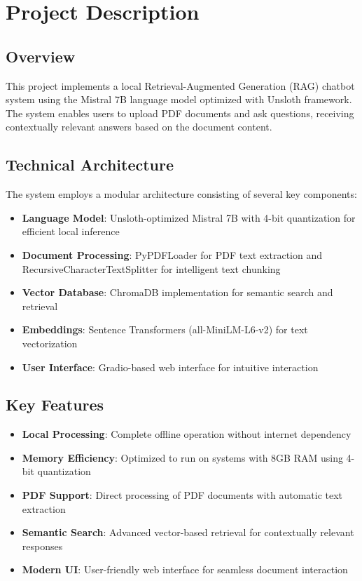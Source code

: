 \section{Project Description}

\subsection{Overview}
This project implements a local Retrieval-Augmented Generation (RAG) chatbot system using the Mistral 7B language model optimized with Unsloth framework. The system enables users to upload PDF documents and ask questions, receiving contextually relevant answers based on the document content.

\subsection{Technical Architecture}
The system employs a modular architecture consisting of several key components:

\begin{itemize}
    \item \textbf{Language Model}: Unsloth-optimized Mistral 7B with 4-bit quantization for efficient local inference
    \item \textbf{Document Processing}: PyPDFLoader for PDF text extraction and RecursiveCharacterTextSplitter for intelligent text chunking
    \item \textbf{Vector Database}: ChromaDB implementation for semantic search and retrieval
    \item \textbf{Embeddings}: Sentence Transformers (all-MiniLM-L6-v2) for text vectorization
    \item \textbf{User Interface}: Gradio-based web interface for intuitive interaction
\end{itemize}

\subsection{Key Features}
\begin{itemize}
    \item \textbf{Local Processing}: Complete offline operation without internet dependency
    \item \textbf{Memory Efficiency}: Optimized to run on systems with 8GB RAM using 4-bit quantization
    \item \textbf{PDF Support}: Direct processing of PDF documents with automatic text extraction
    \item \textbf{Semantic Search}: Advanced vector-based retrieval for contextually relevant responses
    \item \textbf{Modern UI}: User-friendly web interface for seamless document interaction
\end{itemize}

